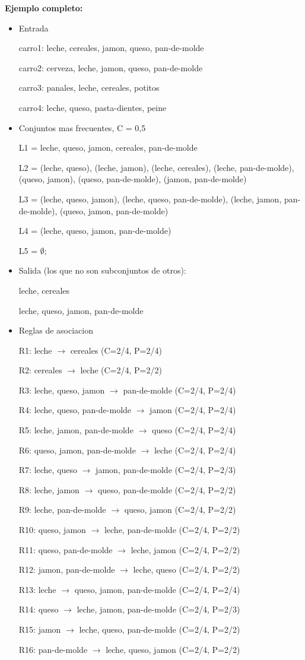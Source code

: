 \documentclass[12pt, twoside, openright]{report} %
\begin{document}
\textbf{Ejemplo completo:}
\begin{itemize}
	\item Entrada

	carro1: leche, cereales, jamon, queso, pan-de-molde

	carro2: cerveza, leche, jamon, queso, pan-de-molde

	carro3: panales, leche, cereales, potitos

	carro4: leche, queso, pasta-dientes, peine
	\item Conjuntos mas frecuentes, C = 0,5

	L1 = {leche, queso, jamon, cereales, pan-de-molde }

	L2 = {(leche, queso), (leche, jamon), (leche, cereales), (leche, pan-de-molde), 
	(queso, jamon), (queso, pan-de-molde), (jamon, pan-de-molde)  }

	L3 = {(leche, queso, jamon), (leche, queso, pan-de-molde),
	(leche, jamon, pan-de-molde), (queso, jamon, pan-de-molde)}

	L4 = {(leche, queso, jamon, pan-de-molde) }

	L5 = $\emptyset$;
	\item Salida (los que no son subconjuntos de otros):

	leche, cereales

	leche, queso, jamon, pan-de-molde
	\item Reglas de asociacion


	R1: leche $\rightarrow$ cereales (C=2/4, P=2/4)

	R2: cereales $\rightarrow$ leche (C=2/4, P=2/2)

	R3: leche, queso, jamon  $\rightarrow$ pan-de-molde (C=2/4, P=2/4)

	R4: leche, queso, pan-de-molde $\rightarrow$ jamon (C=2/4, P=2/4) 

	R5: leche, jamon, pan-de-molde  $\rightarrow$ queso (C=2/4, P=2/4)

	R6: queso, jamon, pan-de-molde  $\rightarrow$ leche (C=2/4, P=2/4)

	R7: leche, queso $\rightarrow$ jamon, pan-de-molde (C=2/4, P=2/3) 

	R8: leche, jamon  $\rightarrow$ queso, pan-de-molde (C=2/4, P=2/2)

	R9: leche, pan-de-molde $\rightarrow$ queso, jamon (C=2/4, P=2/2) 

	R10: queso, jamon  $\rightarrow$ leche, pan-de-molde (C=2/4, P=2/2)

	R11: queso, pan-de-molde $\rightarrow$ leche, jamon (C=2/4, P=2/2) 

	R12: jamon, pan-de-molde  $\rightarrow$ leche, queso (C=2/4, P=2/2)

	R13: leche $\rightarrow$ queso, jamon, pan-de-molde (C=2/4, P=2/4) 

	R14: queso $\rightarrow$ leche, jamon, pan-de-molde (C=2/4, P=2/3) 

	R15: jamon  $\rightarrow$ leche, queso, pan-de-molde (C=2/4, P=2/2)

	R16: pan-de-molde $\rightarrow$ leche, queso, jamon (C=2/4, P=2/2)
\end{itemize}
\end{document}
